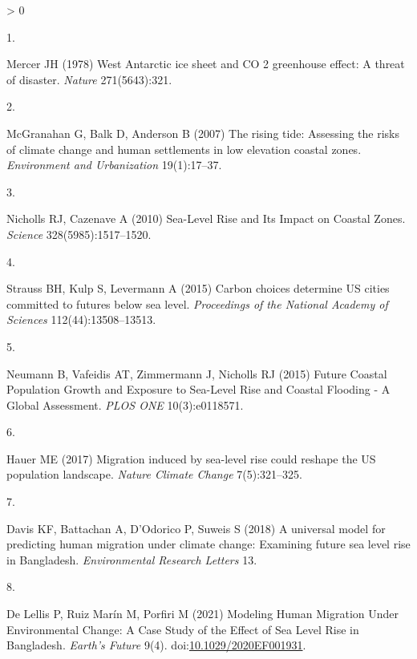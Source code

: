 \documentclass[9pt,twocolumn,twoside,]{pnas-new}
\newlength{\csllabelwidth}
\newlength{\cslhangindent}
\newenvironment{CSLReferences}[3] %
 {%
  \setlength{\parindent}{0pt}
  \ifodd #1 \everypar{\setlength{\hangindent}{\cslhangindent}}\ignorespaces\fi
  \ifnum #2 > 0
  \setlength{\parskip}{#3\baselineskip}
  \fi
 }%
 {}
\newcommand{\CSLLeftMargin}[1]{\parbox[t]{\maxof{\widthof{#1}}{\csllabelwidth}}{#1}}
\newcommand{\CSLRightInline}[1]{\parbox[t]{\linewidth}{#1}}
\begin{document}
\hypertarget{refs}{}
\begin{CSLReferences}{0}{0}
\leavevmode\hypertarget{ref-mercerWestAntarcticIce1978}{}%
\CSLLeftMargin{1. }
\CSLRightInline{Mercer JH (1978) West {Antarctic} ice sheet and {CO} 2
greenhouse effect: A threat of disaster. \emph{Nature} 271(5643):321.}

\leavevmode\hypertarget{ref-mcgranahanRisingTideAssessing2007}{}%
\CSLLeftMargin{2. }
\CSLRightInline{McGranahan G, Balk D, Anderson B (2007) The rising tide:
Assessing the risks of climate change and human settlements in low
elevation coastal zones. \emph{Environment and Urbanization}
19(1):17--37.}

\leavevmode\hypertarget{ref-nichollsSeaLevelRiseIts2010}{}%
\CSLLeftMargin{3. }
\CSLRightInline{Nicholls RJ, Cazenave A (2010) Sea-{Level Rise} and {Its
Impact} on {Coastal Zones}. \emph{Science} 328(5985):1517--1520.}

\leavevmode\hypertarget{ref-straussCarbonChoicesDetermine2015}{}%
\CSLLeftMargin{4. }
\CSLRightInline{Strauss BH, Kulp S, Levermann A (2015) Carbon choices
determine {US} cities committed to futures below sea level.
\emph{Proceedings of the National Academy of Sciences}
112(44):13508--13513.}

\leavevmode\hypertarget{ref-neumannFutureCoastalPopulation2015}{}%
\CSLLeftMargin{5. }
\CSLRightInline{Neumann B, Vafeidis AT, Zimmermann J, Nicholls RJ (2015)
Future {Coastal Population Growth} and {Exposure} to {Sea}-{Level Rise}
and {Coastal Flooding} - {A Global Assessment}. \emph{PLOS ONE}
10(3):e0118571.}

\leavevmode\hypertarget{ref-hauerMigrationInducedSealevel2017}{}%
\CSLLeftMargin{6. }
\CSLRightInline{Hauer ME (2017) Migration induced by sea-level rise
could reshape the {US} population landscape. \emph{Nature Climate
Change} 7(5):321--325.}

\leavevmode\hypertarget{ref-davisUniversalModelPredicting2018}{}%
\CSLLeftMargin{7. }
\CSLRightInline{Davis KF, Battachan A, D'Odorico P, Suweis S (2018) A
universal model for predicting human migration under climate change:
Examining future sea level rise in {Bangladesh}. \emph{Environmental
Research Letters} 13.}

\leavevmode\hypertarget{ref-de_lellis_modeling_2021}{}%
\CSLLeftMargin{8. }
\CSLRightInline{De Lellis P, Ruiz Marín M, Porfiri M (2021) Modeling
{Human} {Migration} {Under} {Environmental} {Change}: {A} {Case} {Study}
of the {Effect} of {Sea} {Level} {Rise} in {Bangladesh}. \emph{Earth's
Future} 9(4).
doi:\href{https://doi.org/10.1029/2020EF001931}{10.1029/2020EF001931}.}


\end{CSLReferences}
\end{document}
